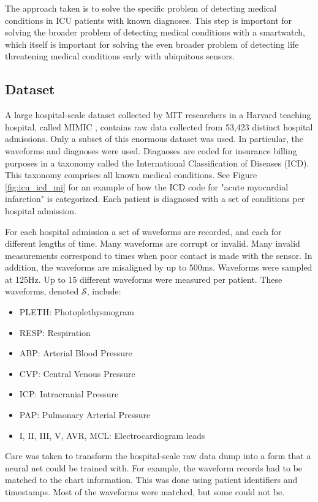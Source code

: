 The approach taken is to solve the specific problem of detecting medical conditions in ICU patients with known diagnoses.  This step is important for solving the broader problem of detecting medical conditions with a smartwatch, which itself is important for solving the even broader problem of detecting life threatening medical conditions early with ubiquitous sensors.

\subsection{Dataset}

A large hospital-scale dataset collected by MIT researchers in a Harvard teaching hospital, called MIMIC \cite{johnson2016mimic}, contains raw data collected from 53,423 distinct hospital admissions.  Only a subset of this enormous dataset was used.  In particular, the waveforms and diagnoses were used.  Diagnoses are coded for insurance billing purposes in a taxonomy called the International Classification of Diseases (ICD).  This taxonomy comprises all known medical conditions. See Figure \ref{fig:icu_icd_mi} for an example of how the ICD code for "acute myocardial infarction" is categorized.  Each patient is diagnosed with a set of conditions per hospital admission.

For each hospital admission a set of waveforms are recorded, and each for different lengths of time.  Many waveforms are corrupt or invalid.  Many invalid measurements correspond to times when poor contact is made with the sensor.  In addition, the waveforms are misaligned by up to 500ms.  Waveforms were sampled at 125Hz.  Up to 15 different waveforms were measured per patient.  These waveforms, denoted $\mathcal{S}$, include:

\begin{itemize}
    \item PLETH: Photoplethysmogram
    \item RESP: Respiration
    \item ABP: Arterial Blood Pressure
    \item CVP: Central Venous Pressure
    \item ICP: Intracranial Pressure
    \item PAP: Pulmonary Arterial Pressure
    \item I, II, III, V, AVR, MCL: Electrocardiogram leads
\end{itemize}

Care was taken to transform the hospital-scale raw data dump into a form that a neural net could be trained with.  For example, the waveform records had to be matched to the chart information.  This was done using patient identifiers and timestamps.  Most of the waveforms were matched, but some could not be.

